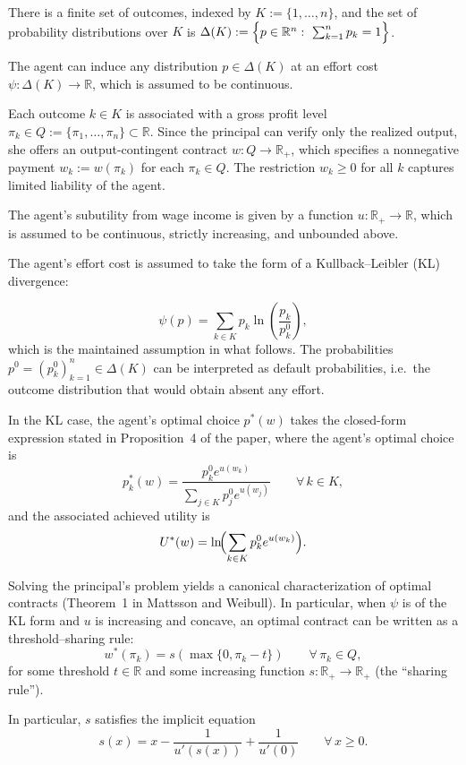 \documentclass[12pt]{article}
\theoremstyle{definition}
\begin{document}
There is a finite set of outcomes, indexed by \(K:=\{1,\ldots,n\}\), and the set of probability distributions over \(K\) is $\Delta(K):=\Bigl\{p\in\mathbb{R}^{n}:\ \sum_{k=1}^{n}p_k=1\Bigr\}$.

The agent can induce any distribution \(p\in\Delta(K)\) at an effort cost \(\psi:\Delta(K)\to\mathbb{R}\), which is assumed to be continuous.

Each outcome \(k\in K\) is associated with a gross profit level \(\pi_k\in Q:=\{\pi_1,\ldots,\pi_n\}\subset\mathbb{R}\). 
Since the principal can verify only the realized output, she offers an output-contingent contract \(w:Q\to\mathbb{R}_{+}\), 
which specifies a nonnegative payment \(w_k:=w(\pi_k)\) for each \(\pi_k\in Q\). The restriction \(w_k\ge 0\) for all \(k\) captures limited liability of the agent.

The agent’s subutility from wage income is given by a function \(u:\mathbb{R}_{+}\to\mathbb{R}\), which is assumed to be continuous, strictly increasing, and unbounded above.

The agent’s effort cost is assumed to take the form of a Kullback--Leibler (KL) divergence:

\[
\psi(p)=\sum_{k\in K} p_k \ln\!\left(\frac{p_k}{p_k^{0}}\right),
\]
which is the maintained assumption in what follows.
The probabilities \(p^{0}=(p_k^{0})_{k=1}^{n}\in\Delta(K)\) can be interpreted as default probabilities, i.e.\ the outcome distribution that would obtain absent any effort.

In the KL case, the agent’s optimal choice \(p^{*}(w)\) takes the closed-form expression stated in Proposition~4 of the paper, where the agent's  optimal choice is
\[
p_k^{*}(w)=\frac{p_k^{0}e^{u(w_k)}}{\sum_{j\in K} p_j^{0}e^{u(w_j)}} \qquad \forall\,k\in K,
\]
and the associated achieved utility is
\[
U^{*}(w)=\ln\!\Bigl(\sum_{k\in K} p_k^{0}e^{u(w_k)}\Bigr).
\]

Solving the principal’s problem yields a canonical characterization of optimal contracts (Theorem~1 in Mattsson and Weibull). In particular, when \(\psi\) is of the KL form and \(u\) is
increasing and concave, an optimal contract can be written as a threshold--sharing rule:
\[
w^{*}(\pi_k)=s\!\left(\max\{0,\pi_k-t\}\right)\qquad \forall\,\pi_k\in Q,
\]
for some threshold \(t\in\mathbb{R}\) and some increasing function \(s:\mathbb{R}_{+}\to\mathbb{R}_{+}\) (the ``sharing rule'').

In particular, \(s\) satisfies the implicit equation
\begin{equation}\label{eq:s(x)}
s(x)=x-\frac{1}{u'(s(x))}+\frac{1}{u'(0)} \qquad \forall\,x\ge 0.
\end{equation}
\end{document}
